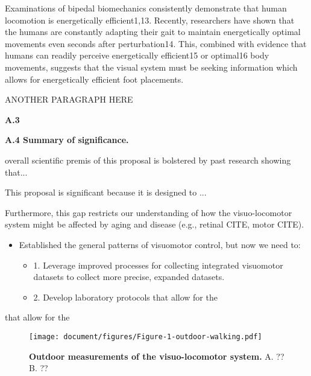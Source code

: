 Examinations of bipedal biomechanics consistently demonstrate that human locomotion is energetically efficient1,13. Recently, researchers have shown that the humans are constantly adapting their gait to maintain energetically optimal movements even seconds after perturbation14. This, combined with evidence that humans can readily perceive energetically efficient15 or optimal16 body movements, suggests that the visual system must be seeking information which allows for energetically efficient foot placements.

ANOTHER PARAGRAPH HERE


\textbf{A.3 } 


\textbf{A.4 Summary of significance.} 

overall scientific premis of this proposal is bolstered by past research showing that...

This proposal is significant because it is designed to ...


  Furthermore, this gap restricts our understanding of how the visuo-locomotor system might be affected by aging and disease (e.g., retinal CITE, motor CITE).  



\begin{itemize}
\item
  Established the general patterns of visuomotor control, but now we
  need to:

  \begin{itemize}
  \item
    1. Leverage improved processes for collecting integrated visuomotor
    datasets to collect more precise, expanded datasets.
  \item
    2. Develop laboratory protocols that allow for the
  \end{itemize}
\end{itemize}
that allow for the

\begin{figure}[h]
\centering
\texttt{[image: document/figures/Figure-1-outdoor-walking.pdf]}
\caption{\textbf{Outdoor measurements of the visuo-locomotor system.} A. ?? B. ??}
\end{figure}
